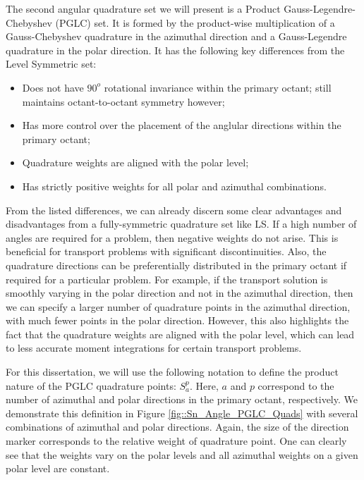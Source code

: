 The second angular quadrature set we will present is a Product Gauss-Legendre-Chebyshev (PGLC) set. It is formed by the product-wise multiplication of a Gauss-Chebyshev quadrature in the azimuthal direction and a Gauss-Legendre quadrature in the polar direction. It has the following key differences from the Level Symmetric set:

\begin{itemize}
	\item Does not have $90^o$ rotational invariance within the primary octant; still maintains octant-to-octant symmetry however;
	\item Has more control over the placement of the anglular directions within the primary octant;
	\item Quadrature weights are aligned with the polar level;
	\item Has strictly positive weights for all polar and azimuthal combinations.
\end{itemize}

From the listed differences, we can already discern some clear advantages and disadvantages from a fully-symmetric quadrature set like LS. If a high number of angles are required for a problem, then negative weights do not arise. This is beneficial for transport problems with significant discontinuities. Also, the quadrature directions can be preferentially distributed in the primary octant if required for a particular problem. For example, if the transport solution is smoothly varying in the polar direction and not in the azimuthal direction, then we can specify a larger number of quadrature points in the azimuthal direction, with much fewer points in the polar direction. However, this also highlights the fact that the quadrature weights are aligned with the polar level, which can lead to less accurate moment integrations for certain transport problems. 

For this dissertation, we will use the following notation to define the product nature of the PGLC quadrature points: $S_{a}^{p}$. Here, $a$ and $p$ correspond to the number of azimuthal and polar directions in the primary octant, respectively. We demonstrate this definition in Figure \ref{fig::Sn_Angle_PGLC_Quads} with several combinations of azimuthal and polar directions. Again, the size of the direction marker corresponds to the relative weight of quadrature point. One can clearly see that the weights vary on the polar levels and all azimuthal weights on a given polar level are constant.

